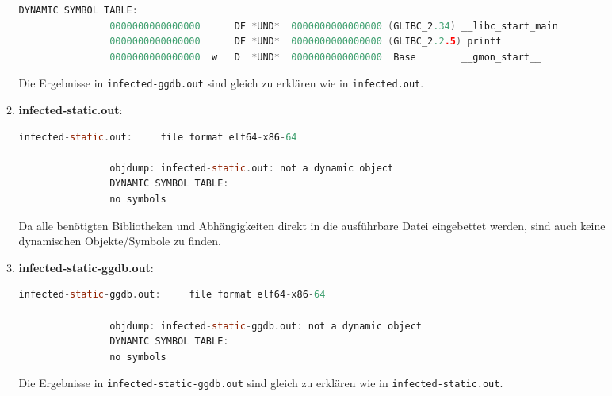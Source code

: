 \documentclass{article}
\begin{document}
\begin{enumerate}
\begin{enumerate}
\begin{lstlisting}[language=c]
				DYNAMIC SYMBOL TABLE:
				0000000000000000      DF *UND*  0000000000000000 (GLIBC_2.34) __libc_start_main
				0000000000000000      DF *UND*  0000000000000000 (GLIBC_2.2.5) printf
				0000000000000000  w   D  *UND*  0000000000000000  Base        __gmon_start__
			\end{lstlisting}
			Die Ergebnisse in \texttt{infected-ggdb.out} sind gleich zu erklären wie in \texttt{infected.out}.\\
			\item \textbf{infected-static.out}:\\
			\begin{lstlisting}[language=c]
				infected-static.out:     file format elf64-x86-64
				
				objdump: infected-static.out: not a dynamic object
				DYNAMIC SYMBOL TABLE:
				no symbols
			\end{lstlisting}
			Da alle benötigten Bibliotheken und Abhängigkeiten direkt in die ausführbare Datei eingebettet werden, sind auch keine dynamischen Objekte/Symbole zu finden.\\
			\item \textbf{infected-static-ggdb.out}:\\
			\begin{lstlisting}[language=c]
				infected-static-ggdb.out:     file format elf64-x86-64
				
				objdump: infected-static-ggdb.out: not a dynamic object
				DYNAMIC SYMBOL TABLE:
				no symbols
			\end{lstlisting}
			Die Ergebnisse in \texttt{infected-static-ggdb.out} sind gleich zu erklären wie in \texttt{infected-static.out}.\\ 
		\end{enumerate}
		
		\pagebreak
		

\end{enumerate}
\end{document}
